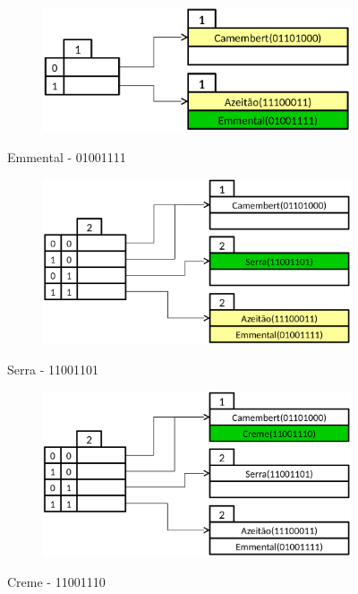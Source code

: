 \begin{figure}[H]
	\begin{center}
	\begin{subfigure}[b]{0.5\textwidth}
		\centering
		\includegraphics[width=\textwidth]{fig4.png}

	\end{subfigure}
	\caption{Emmental - 01001111}
	\end{center}
\end{figure}
\begin{figure}[H]
	\begin{center}
	\begin{subfigure}[b]{0.5\textwidth}
		\centering
		\includegraphics[width=\textwidth]{fig5.png}

	\end{subfigure}
	\caption{Serra - 11001101}
	\end{center}
\end{figure}
\begin{figure}[H]
	\begin{center}
	\begin{subfigure}[b]{0.5\textwidth}
		\centering
		\includegraphics[width=\textwidth]{fig6.png}

	\end{subfigure}
	\caption{Creme - 11001110}
	\end{center}
\end{figure}

